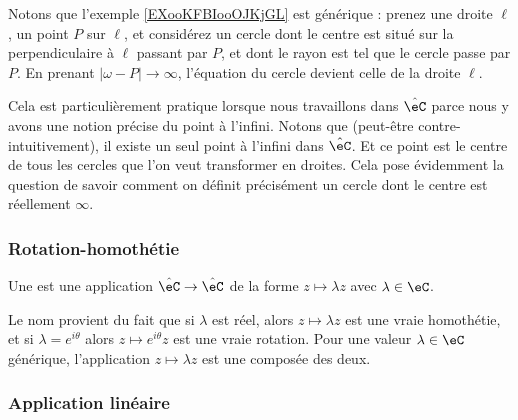 \begin{normaltext}\label{NORMooCXVJooMTMqEU}
Notons que l'exemple \ref{EXooKFBIooOJKjGL} est générique : prenez une droite \( \ell\), un point \( P\) sur \( \ell\), et considérez un cercle dont le centre est situé sur la perpendiculaire à \( \ell\) passant par \( P\), et dont le rayon est tel que le cercle passe par \( P\). En prenant \( | \omega-P |\to \infty\), l'équation du cercle devient celle de la droite \( \ell\).

Cela est particulièrement pratique lorsque nous travaillons dans \( \hat \eC\) parce nous y avons une notion précise du point à l'infini. Notons que (peut-être contre-intuitivement), il existe un seul point à l'infini dans \( \hat \eC\). Et ce point est le centre de tous les cercles que l'on veut transformer en droites. Cela pose évidemment la question de savoir comment on définit précisément un cercle dont le centre est réellement \( \infty\).
\end{normaltext}


\begin{center}
   
\end{center}

\subsubsection{Rotation-homothétie}

\begin{definition}
    Une  est une application \(  \hat \eC \to \hat \eC\) de la forme \( z\mapsto \lambda z\) avec \( \lambda\in \eC\).
\end{definition}
Le nom provient du fait que si \( \lambda\) est réel, alors \( z\mapsto \lambda z\) est une vraie homothétie, et si \( \lambda= e^{i\theta}\) alors \( z\mapsto  e^{i\theta}z\) est une vraie rotation. Pour une valeur \( \lambda\in \eC\) générique, l'application \( z\mapsto \lambda z\) est une composée des deux.

\subsubsection{Application linéaire}
\label{SSUBSooRBCWooSCIQEL}

